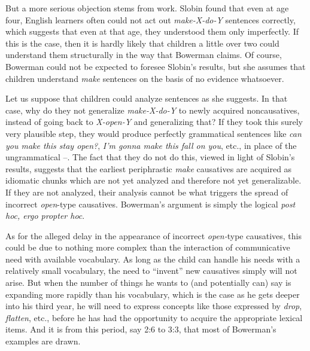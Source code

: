 But a more serious objection stems from  work.
Slobin found that even at age four, English learners often could not act out \textit{make-X-do-Y} sentences correctly, which suggests that even at that age, they understood them only imperfectly. If this is the case, then it is hardly likely that children a little over two could understand them structurally in the way that Bowerman claims. Of course, Bower\-man could not be expected to foresee Slobin's results, but she assumes that children understand \textit{make} sentences on the basis of no evidence whatsoever.

Let us suppose that children could analyze sentences as she suggests. In that case, why do they not generalize \textit{make-X-do-Y} to newly acquired noncausatives, instead of going back to \textit{X-open-Y} and generalizing that? If they took this surely very plausible step, they would produce perfectly grammatical sentences like \textit{can you make this stay open?}, \textit{I'm gonna make this fall on you}, etc., in place of the ungrammatical --. The fact that they do not do this, viewed in light of Slobin's results, suggests that the earliest periphrastic \textit{make} causatives are acquired as idiomatic chunks which are not yet analyzed and therefore not yet generalizable. If they are not analyzed, their analysis cannot be what triggers the spread of incorrect \textit{open}-type causatives. Bowerman's argument is simply the logical \textit{post hoc, ergo propter hoc}.

As for the alleged delay in the appearance of incorrect \textit{open-}type causatives, this could be due to nothing more complex than the interaction of communicative need with available vocabulary. As long as the child can handle his needs with a relatively small vocabulary, the need to ``invent'' new causatives simply will not arise. But when the number of things he wants to (and potentially can) say is expanding more rapidly than his vocabulary, which is the case as he gets deeper into his third year, he will need to express concepts like those expressed by \textit{drop}, \textit{flatten}, etc., before he has had the opportunity to acquire the appropriate lexical items. And it is from this period, say 2:6 to 3:3, that most of Bowerman's examples are drawn.\\\\

